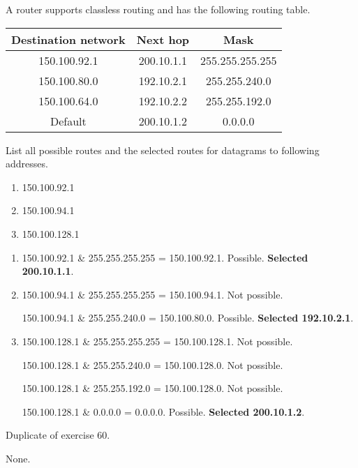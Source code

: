 \begin{Exercise}
A router supports classless routing and has the following routing table.

\begin{center}
\begin{tabular}{c c c}
    Destination network & Next hop   & Mask            \\ \hline
           150.100.92.1 & 200.10.1.1 & 255.255.255.255 \\ \hline
           150.100.80.0 & 192.10.2.1 & 255.255.240.0   \\ \hline
           150.100.64.0 & 192.10.2.2 & 255.255.192.0   \\ \hline
                Default & 200.10.1.2 & 0.0.0.0
\end{tabular}
\end{center}

List all possible routes and the selected routes for datagrams to following addresses.
\begin{enumerate}
\item 150.100.92.1
\item 150.100.94.1
\item 150.100.128.1
\end{enumerate}
\end{Exercise}
\begin{Answer}
\begin{enumerate}
\item 150.100.92.1 \& 255.255.255.255 = 150.100.92.1. Possible. \textbf{Selected 200.10.1.1}.
\item 150.100.94.1 \& 255.255.255.255 = 150.100.94.1. Not possible.

150.100.94.1 \& 255.255.240.0 = 150.100.80.0. Possible. \textbf{Selected 192.10.2.1}.

\item 150.100.128.1 \& 255.255.255.255 = 150.100.128.1. Not possible.

150.100.128.1 \& 255.255.240.0 = 150.100.128.0. Not possible.

150.100.128.1 \& 255.255.192.0 = 150.100.128.0. Not possible.

150.100.128.1 \& 0.0.0.0 = 0.0.0.0. Possible. \textbf{Selected 200.10.1.2}.
\end{enumerate}
\end{Answer}

\begin{Exercise}
Duplicate of exercise 60.
\end{Exercise}
\begin{Answer}
None.
\end{Answer}

